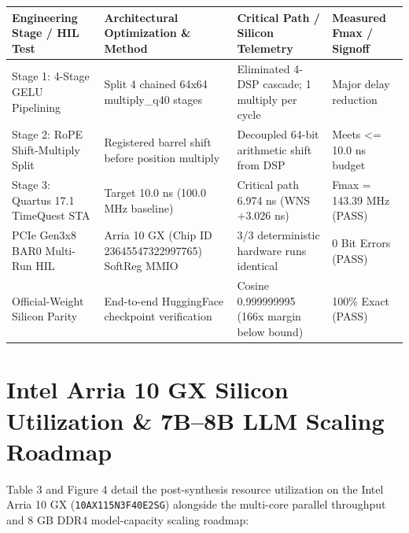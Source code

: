 \documentclass[11pt,a4paper]{article}
\begin{document}
{\footnotesize\renewcommand{\arraystretch}{1.14}\begin{longtable}{@{}L{0.23\textwidth}L{0.27\textwidth}L{0.24\textwidth}L{0.16\textwidth}@{}}\toprule

\textbf{Engineering Stage /\allowbreak{} HIL Test} & \textbf{Architectural Optimization \& Method} & \textbf{Critical Path /\allowbreak{} Silicon Telemetry} & \textbf{Measured Fmax /\allowbreak{} Signoff}\\\midrule\endhead

Stage 1: 4-Stage GELU Pipelining & Split 4 chained 64x64 multiply\_\allowbreak{}q40 stages & Eliminated 4-DSP cascade; 1 multiply per cycle & Major delay reduction\\[2pt]

Stage 2: RoPE Shift-Multiply Split & Registered barrel shift before position multiply & Decoupled 64-bit arithmetic shift from DSP & Meets <=\allowbreak{} 10.0 ns budget\\[2pt]

Stage 3: Quartus 17.1 TimeQuest STA & Target 10.0 ns (\allowbreak{}100.0 MHz baseline)\allowbreak{} & Critical path 6.974 ns (\allowbreak{}WNS +\allowbreak{}3.026 ns)\allowbreak{} & Fmax =\allowbreak{} 143.39 MHz (\allowbreak{}PASS)\allowbreak{}\\[2pt]

PCIe Gen3x8 BAR0 Multi-Run HIL & Arria 10 GX (\allowbreak{}Chip ID 23645547\allowbreak{}32299776\allowbreak{}5)\allowbreak{} SoftReg MMIO & 3/\allowbreak{}3 deterministic hardware runs identical & 0 Bit Errors (\allowbreak{}PASS)\allowbreak{}\\[2pt]

Official-Weight Silicon Parity & End-to-end HuggingFace checkpoint verification & Cosine 0.99999999\allowbreak{}5 (\allowbreak{}166x margin below bound)\allowbreak{} & 100\% Exact (\allowbreak{}PASS)\allowbreak{}\\[2pt]

\bottomrule\end{longtable}}

\section{Intel Arria 10 GX Silicon Utilization \& 7B--8B LLM Scaling Roadmap}

Table 3 and Figure 4 detail the post-synthesis resource utilization on the Intel Arria 10 GX (\texttt{10AX115N3F40E2SG}) alongside the multi-core parallel throughput and 8 GB DDR4 model-capacity scaling roadmap:
\end{document}
